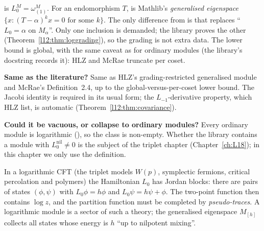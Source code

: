 \begin{dictionary}
 is $L_0^M = \omega^M_{(1)}$. For an endomorphism $T$,
 is Mathlib's \emph{generalised eigenspace}
$\{x : (T-\alpha)^kx = 0\text{ for some }k\}$. The only difference from  is that
 replaces ``$L_0 = \alpha$ on $M_\alpha$''. Only one inclusion is
demanded; the library proves the other (Theorem~\ref{l12:thm:loggrading}), so the grading is not extra
data. The lower bound is global, with the same caveat as for ordinary modules (the library's docstring
records it): HLZ and McRae truncate per coset.

\textbf{Same as the literature?} Same as HLZ's grading-restricted generalised module and McRae's
Definition~2.4, up to the global-versus-per-coset lower bound. The Jacobi identity is required in its
usual form; the $L_{-1}$-derivative property, which HLZ list, is automatic
(Theorem~\ref{l12:thm:covariance}).

\textbf{Could it be vacuous, or collapse to ordinary modules?} Every ordinary module is logarithmic
(), so the class is non-empty. Whether the library contains a module with
$L_0^{\mathrm{nil}}\neq0$ is the subject of the triplet chapter (Chapter~\ref{ch:L18}); in this chapter we
only use the definition.
\end{dictionary}

\begin{physics}
In a logarithmic CFT (the triplet models $W(p)$, symplectic fermions, critical percolation and polymers) the
Hamiltonian $L_0$ has Jordan blocks: there are pairs of states $(\phi,\psi)$ with $L_0\phi = h\phi$ and
$L_0\psi = h\psi+\phi$. The two-point function then contains $\log z$, and the partition function must be
completed by \emph{pseudo-traces}. A logarithmic module is a sector of such a theory; the generalised
eigenspace $M_{[h]}$ collects all states whose energy is $h$ ``up to nilpotent mixing''.
\end{physics}


